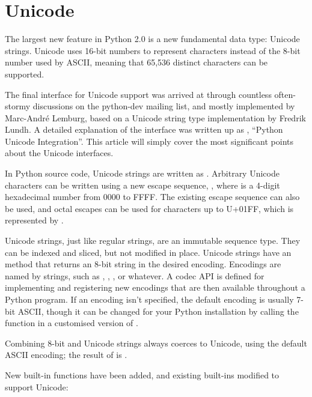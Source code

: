 \documentclass{howto}
\begin{document}
\section{Unicode}

The largest new feature in Python 2.0 is a new fundamental data type:
Unicode strings.  Unicode uses 16-bit numbers to represent characters
instead of the 8-bit number used by ASCII, meaning that 65,536
distinct characters can be supported.

The final interface for Unicode support was arrived at through
countless often-stormy discussions on the python-dev mailing list, and
mostly implemented by Marc-Andr\'e Lemburg, based on a Unicode string
type implementation by Fredrik Lundh.  A detailed explanation of the
interface was written up as , ``Python Unicode Integration''.
This article will simply cover the most significant points about the
Unicode interfaces.

In Python source code, Unicode strings are written as
.  Arbitrary Unicode characters can be written using a
new escape sequence, , where  is a
4-digit hexadecimal number from 0000 to FFFF.  The existing
 escape sequence can also be used, and octal
escapes can be used for characters up to U+01FF, which is represented
by .

Unicode strings, just like regular strings, are an immutable sequence
type.  They can be indexed and sliced, but not modified in place.
Unicode strings have an  method
that returns an 8-bit string in the desired encoding.  Encodings are
named by strings, such as , ,
, or whatever.  A codec API is defined for
implementing and registering new encodings that are then available
throughout a Python program.  If an encoding isn't specified, the
default encoding is usually 7-bit ASCII, though it can be changed for
your Python installation by calling the
 function in a
customised version of .

Combining 8-bit and Unicode strings always coerces to Unicode, using
the default ASCII encoding; the result of  is
.

New built-in functions have been added, and existing built-ins
modified to support Unicode:
\end{document}
